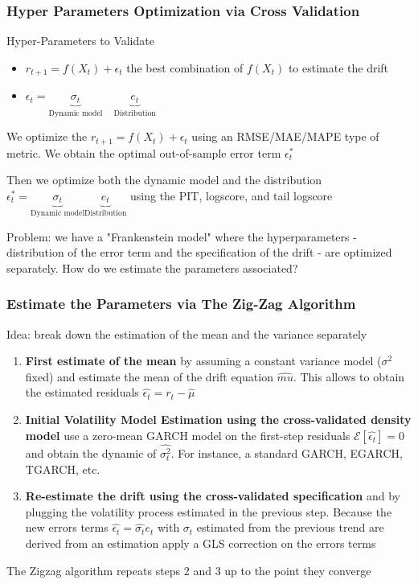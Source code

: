 \documentclass{beamer}
\newenvironment{wideitemize}{\itemize\addtolength{\itemsep}{10pt}}{\enditemize}
\begin{document}
\begin{frame}
  \frametitle{Hyper Parameters Optimization via Cross Validation}
  \begin{alertblock}{Hyper-Parameters to Validate}
    \begin{itemize}
    \item $r_{t+1}  = f(X_t) + \epsilon_t$ the best combination of $f(X_t)$ to estimate the drift
    \item $\epsilon_t  = \underbrace{\sigma_t}_{\text{Dynamic model}} \quad \underbrace{e_t}_{\text{Distribution}}$
    \end{itemize}
  \end{alertblock}
  \begin{wideitemize}
    \item We optimize the $r_{t+1}  = f(X_t) + \epsilon_t$ using an RMSE/MAE/MAPE type of metric. We obtain the optimal out-of-sample error term $\epsilon^{*}_t$
    \item Then we optimize both the dynamic model and the distribution $\epsilon^{*}_t = \underbrace{\sigma_t}_{\text{Dynamic model}} \underbrace{e_t}_{\text{Distribution}}$ using the PIT, logscore, and tail logscore
   \item Problem: we have a "Frankenstein model" where the hyperparameters  - distribution of the error term and the specification of the drift - are optimized separately. How do we estimate the parameters associated?
  \end{wideitemize}
\end{frame}



\begin{frame}
  \frametitle{Estimate the Parameters via The Zig-Zag Algorithm}
  \begin{wideitemize}
  \item Idea: break down the estimation of the mean and the variance separately
    \begin{enumerate}
    \item \textbf{First estimate of the mean} by assuming a constant variance model ($\sigma^2$ fixed) and estimate the mean of the drift equation $\hat{mu}$. This allows to obtain the estimated residuals $\hat{\epsilon_t} = r_t - \hat{\mu}$
    \item \textbf{Initial Volatility Model Estimation using the cross-validated density model} use a zero-mean GARCH model on the first-step residuals $\mathcal{E}[\hat{\epsilon_t}] = 0$ and obtain the dynamic of $\hat{\sigma^2_t}$. For instance, a standard GARCH, EGARCH, TGARCH, etc.
\item \textbf{Re-estimate the drift using the cross-validated specification} and by plugging the volatility process estimated in the previous step. Because the new errors terms $\hat{\epsilon_t} = \hat{\sigma_t}e_t$ with  $\hat{\sigma_t}$ estimated from the previous trend are derived from an estimation apply a GLS correction on the errors terms 
    \end{enumerate}
\item The Zigzag algorithm repeats steps 2 and 3 up to the point they converge
  \end{wideitemize}
\end{frame}
\end{document}
